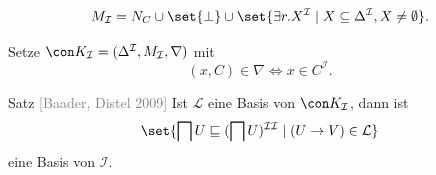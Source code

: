 \documentclass[ngerman]{beamer}
\newcommand{\pseudocite}[1]{\textcolor{gray}{[#1]}}
\begin{document}


\begin{frame}

  \onslide<+->

  \begin{Definition}
    \begin{equation*}
      M_{\mathcal{I}} = N_{C} \cup \set{ \bot } \cup \set{ \exists r. X^{\mathcal{I}} \mid
        X \subseteq \Delta^{\mathcal{I}}, X \neq \emptyset }.
    \end{equation*}
  \end{Definition}

  \onslide<+->

  \begin{Definition}
    Setze $\con K_{\mathcal{I}} = (\Delta^{\mathcal{I}}, M_{\mathcal{I}}, \nabla)$ mit
    \begin{equation*}
      (x, C) \in \nabla \iff x \in C^{\mathcal{I}}.
    \end{equation*}
  \end{Definition}

  \onslide<+->

  \begin{block}{Satz \pseudocite{Baader, Distel 2009}}
    Ist $\mathcal{L}$ eine Basis von $\con K_{\mathcal{I}}$, dann ist
    \begin{equation*}
      \set{ \bigsqcap U \sqsubseteq (\bigsqcap U)^{\mathcal{I}\mathcal{I}} \mid (U \to V)
        \in \mathcal{L} }
    \end{equation*}
    eine Basis von $\mathcal{I}$.    
  \end{block}
  
\end{frame}
\end{document}
